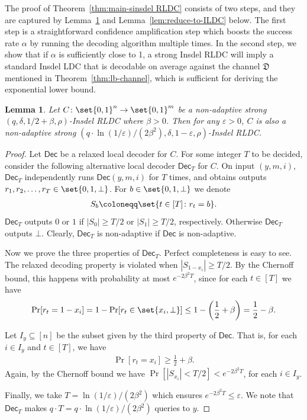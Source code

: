 \documentclass[10pt,a4paper]{article}
\newtheorem{lemma}{Lemma}
\theoremstyle{remark}
\newcommand{\tuple}[1]{\ensuremath{\left(#1\right)}}
\newcommand{\tp}{\tuple}
\newcommand{\eps}{\ensuremath{\varepsilon}}
\newcommand{\Dec}{\ensuremath{\mathsf{Dec}}\xspace}
\begin{document}
The proof of Theorem~\ref{thm:main-sinsdel RLDC} consists of two steps, and they are captured by Lemma~\ref{lem:amplify} and Lemma~\ref{lem:reduce-to-ILDC} below. The first step is a straightforward confidence amplification step which boosts the success rate $\alpha$ by running the decoding algorithm multiple times. In the second step, we show that if $\alpha$ is sufficiently close to 1, a strong Insdel RLDC will imply a standard Insdel LDC that is decodable on average against the channel $\mathfrak{D}$ mentioned in Theorem~\ref{thm:lb-channel}, which is sufficient for deriving the exponential lower bound.

\begin{lemma} \label{lem:amplify}
Let $C \colon \set{0,1}^n \rightarrow \set{0,1}^m$ be a non-adaptive strong $(q,\delta,1/2+\beta,\rho)$-Insdel RLDC where $\beta > 0$. Then for any $\eps > 0$, $C$ is also a non-adaptive strong $(q\cdot \ln(1/\eps)/(2\beta^2), \delta, 1-\eps, \rho)$-Insdel RLDC.
\end{lemma}
\begin{proof}
Let $\Dec$ be a relaxed local decoder for $C$. For some integer $T$ to be decided, consider the following alternative local decoder $\Dec_{T}$ for $C$. On input $(y, m, i)$, $\Dec_T$ independently runs $\Dec(y, m, i)$ for $T$ times, and obtains outputs $r_1, r_2,\dots, r_T \in \set{0,1,\bot}$. For $b \in \set{0,1,\bot}$ we denote 
\begin{align*}
S_b \coloneqq \set{t \in [T] \colon r_t = b}. 
\end{align*}
$\Dec_T$ outputs $0$ or $1$ if $|S_0| \ge T/2$ or $|S_1| \ge T/2$, respectively. Otherwise $\Dec_T$ outputs $\bot$. Clearly, $\Dec_T$ is non-adaptive if $\Dec$ is non-adaptive.

Now we prove the three properties of $\Dec_T$. Perfect completeness is easy to see. The relaxed decoding property is violated when $|S_{1-x_i}| \ge T/2$. By the Chernoff bound, this happens with probability at most $e^{-2\beta^2 T}$, since for each $t \in [T]$ we have 
\begin{align*}
\Pr[r_t = 1-x_i] = 1-\Pr[r_t \in \set{x_i, \perp}] \le 1 - \tp{\frac{1}{2} + \beta} = \frac{1}{2}-\beta.
\end{align*}

Let $I_y \subseteq [n]$ be the subset given by the third property of $\Dec$. That is, for each $i \in I_y$ and $t \in [T]$, we have 
\begin{align*}
\Pr[r_t = x_i] \ge \frac{1}{2}+\beta.
\end{align*}
Again, by the Chernoff bound we have $\Pr[|S_{x_i}| < T/2] < e^{-2\beta^2 T}$, for each $i \in I_y$.

Finally, we take $T = \ln(1/\eps)/(2\beta^2)$ which ensures $e^{-2\beta^2 T} \le \eps$. We note that $\Dec_{T}$ makes $q\cdot T = q\cdot \ln(1/\eps)/(2\beta^2)$ queries to $y$.
\end{proof}
\end{document}
